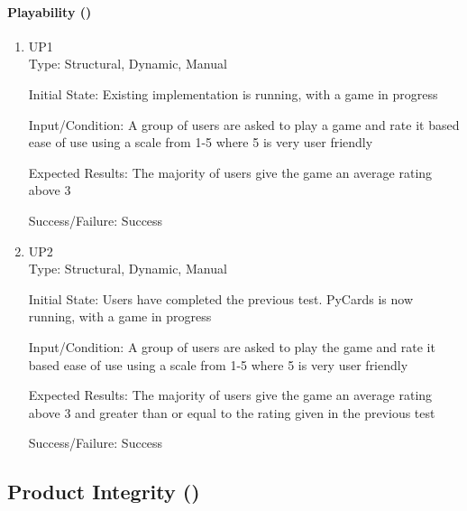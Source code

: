 \documentclass[12pt, titlepage]{article}
\begin{document}
	\paragraph{Playability ()}
	\begin{enumerate}
		\item{UP1\\}
		Type: Structural, Dynamic, Manual
		
		Initial State: Existing implementation is running, with a game in progress
		
		Input/Condition: A group of users are asked to play a game and rate it based
		ease of use using a scale from 1-5 where 5 is very user friendly
		
		Expected Results: The majority of users give the game an average rating above 3

		Success/Failure: Success

		\item{UP2\\}
		Type: Structural, Dynamic, Manual
		
		Initial State: Users have completed the previous test. PyCards is now running,
		with a game in progress
		
		Input/Condition: A group of users are asked to play the game and rate it based
		ease of use using a scale from 1-5 where 5 is very user friendly
		
		Expected Results: The majority of users give the game an average rating above 3
		and greater than or equal to the rating given in the previous test

		Success/Failure: Success
	\end{enumerate}

	\subsection{Product Integrity ()}
\end{document}
